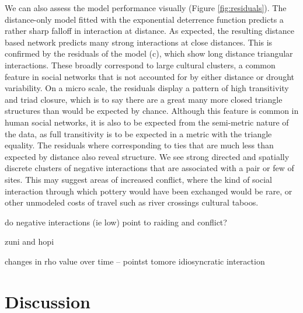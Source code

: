 \documentclass[fleqn,10pt]{wlscirep}
\begin{document}
We can also assess the model performance visually (Figure \ref{fig:residuals}). The distance-only model fitted with the exponential deterrence function predicts a rather sharp falloff in interaction at distance. As expected, the resulting distance based network predicts many strong interactions at close distances. This is confirmed by the residuals of the model (c), which show long distance triangular interactions. These broadly correspond to large cultural clusters, a common feature in social networks that is not accounted for by either distance or drought variability. On a micro scale, the residuals display a pattern of high transitivity and triad closure, which is to say there are a great many more closed triangle structures than would be expected by chance. Although this feature is common in human social networks, it is also to be expected from the semi-metric nature of the data, as full transitivity is to be expected in a metric with the triangle equality. The residuals where corresponding to ties that are much less than expected by distance also reveal structure. We see strong directed and spatially discrete clusters of negative interactions that are associated with a pair or few of sites. This may suggest areas of increased conflict, where the kind of social interaction through which pottery would have been exchanged would be rare, or other unmodeled costs of travel such as river crossings cultural taboos. 

do negative interactions (ie low) point to raiding and conflict?

zuni and hopi

changes in rho value over time -- pointst tomore idiosyncratic interaction




\section*{Discussion}
\end{document}
